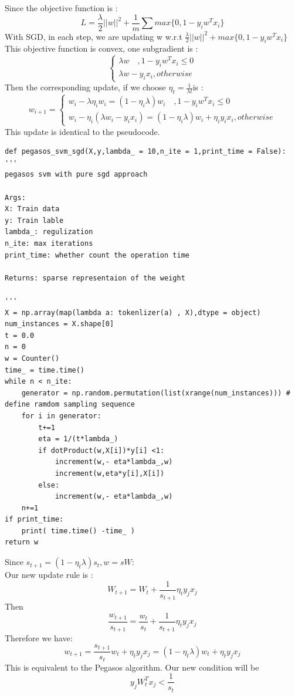 \documentclass{article}
\newenvironment{problem}[2][$\bullet$]{\begin{trivlist}\large
		\item[\hskip \labelsep {\bfseries #1}\hskip \labelsep {\bfseries #2.}]}  {\end{trivlist}}
\begin{document}
\begin{problem}{6.1}
\end{problem}
Since the objective function is :
$$L = \frac{\lambda}{2} ||w||^2 + \frac{1}{m} \sum max\{0,1-y_iw^Tx_i\}$$
With SGD, in each step, we are updating w w.r.t $\frac{\lambda}{2} ||w||^2 + max\{0,1-y_iw^Tx_i\}$\\
This objective function is convex, one subgradient is :
$$\begin{cases}
\lambda w \quad ,1 -y_iw^Tx_i \leq 0\\
\lambda w-y_ix_i , otherwise
\end{cases}$$
Then the corresponding update, if we choose $\eta_t = \frac{1}{\lambda t} $is :
$$w_{i+1} = \begin{cases}
 w_{i} -\lambda \eta_i w_i = (1 - \eta_i \lambda)w_i \quad ,1 -y_iw^Tx_i \leq 0\\
w_i - \eta_i ( \lambda w_i-y_ix_i ) = (1- \eta_i\lambda)w_i + \eta_iy_ix_i, otherwise
\end{cases}$$
This update is identical to the pseudocode. \\

\begin{problem}{6.2}
\end{problem}
\begin{verbatim}
def pegasos_svm_sgd(X,y,lambda_ = 10,n_ite = 1,print_time = False):
'''
pegasos svm with pure sgd approach

Args:
X: Train data
y: Train lable
lambda_: regulization
n_ite: max iterations
print_time: whether count the operation time

Returns: sparse representaion of the weight

'''
X = np.array(map(lambda a: tokenlizer(a) , X),dtype = object)
num_instances = X.shape[0]
t = 0.0
n = 0
w = Counter()
time_ = time.time()
while n < n_ite:
	generator = np.random.permutation(list(xrange(num_instances))) # define ramdom sampling sequence
	for i in generator:
		t+=1
		eta = 1/(t*lambda_)
		if dotProduct(w,X[i])*y[i] <1:
			increment(w,- eta*lambda_,w)
			increment(w,eta*y[i],X[i])
		else:
			increment(w,- eta*lambda_,w)
	n+=1
if print_time:
	print( time.time() -time_ )
return w
\end{verbatim}

\begin{problem}{6.3}
\end{problem}
Since $s_{t+1} = (1-\eta_t \lambda)s_t, w= sW$:\\
Our new update rule is :
$$W_{t+1} = W_t + \frac{1}{s_{t+1}}\eta_t y_jx_j$$ Then
$$\frac{w_{t+1}}{s_{t+1}} =\frac{w_t}{s_t}  + \frac{1}{s_{t+1}}\eta_t y_jx_j $$
Therefore we have:
$$w_{t+1} = \frac{s_{t+1}}{s_t}w_t + \eta_ty_jx_j =(1-\eta_t \lambda)w_t + \eta_ty_jx_j $$
This is equivalent to the Pegasos algorithm. 
Our new condition will be $$y_jW_t^Tx_j < \frac{1}{s_t}$$\\
\end{document}

